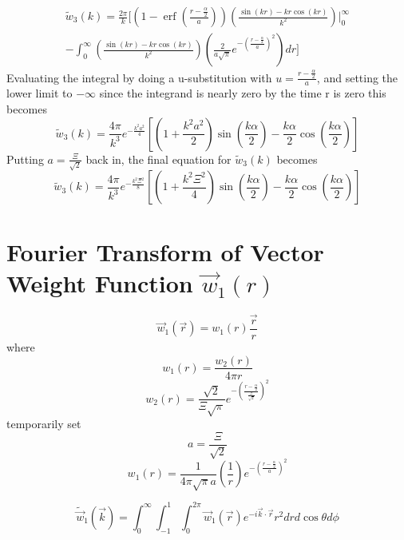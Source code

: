 \documentclass[double,12pt]{beavtex}
\begin{document}
\begin{multline}
  \widetilde{w}_3(k)=\frac{2\pi}{k}\Bigg[\left(1-\operatorname{erf}\left(\frac{r-\frac{\alpha}{2}}{a}\right)\right)\left(\frac{\sin(kr)-kr\cos(kr)}{k^2}\right)\bigg|^{\infty}_0
   \\
  -\int_{0}^{\infty}\left(\frac{\sin(kr)-kr\cos(kr)}{k^2}\right)\left(\frac{2}{a\sqrt{\pi}}e^{-\left(\frac{r-\frac{\alpha}{2}}{a}\right)^2}\right)dr\Bigg]
\end{multline}
Evaluating the integral by doing a u-substitution with $u=\frac{r-\frac{\alpha}{2}}{a}$, and setting the lower limit to $-\infty$  since the integrand is nearly zero by the time r is zero this becomes
\begin{equation}{\widetilde{w}_3(k)=\frac{4\pi}{k^3}e^{-\frac{k^2a^2}{4}}\left[\left(1+\frac{k^2a^2}{2}\right)\sin\left(\frac{k\alpha}{2}\right)-\frac{k\alpha}{2}\cos\left(\frac{k\alpha}{2}\right)\right]}\end{equation}
Putting $a=\frac{\Xi}{\sqrt{2}}$ back in, the final equation for $\widetilde{w}_3(k)$ becomes
\begin{equation}{\widetilde{w}_3(k)=\frac{4\pi}{k^3}e^{-\frac{k^2\Xi^2}{8}}\left[\left(1+\frac{k^2\Xi^2}{4}\right)\sin\left(\frac{k\alpha}{2}\right)-\frac{k\alpha}{2}\cos\left(\frac{k\alpha}{2}\right)\right]}\end{equation}

\section{Fourier Transform of Vector Weight Function $\vec{w}_{1}(r)$}
\begin{equation}{\vec{w}_1(\vec{r})=w_1(r)\frac{\vec{r}}{r}}\end{equation}
where
\begin{equation}{w_1(r)=\frac{w_2(r)}{4{\pi}r}}\end{equation}
\begin{equation}{w_2(r)=\frac{\sqrt{2}}{\Xi\sqrt{\pi}}e^{-\left(\frac{r-\frac{\alpha}{2}}{\frac{\Xi}{\sqrt{2}}}\right)^2}}\end{equation}
temporarily set 
\begin{equation}{a=\frac{\Xi}{\sqrt{2}}}\end{equation}
\begin{equation}{w_1(r)=\frac{1}{4{\pi}\sqrt{\pi}a}\left(\frac{1}{r}\right)e^{-\left(\frac{r-\frac{\alpha}{2}}{a}\right)^2}}\end{equation}

\begin{equation}{\widetilde{\vec{w}}_1(\vec{k})=\int_{0}^{\infty}\int_{-1}^{1}\int_{0}^{2\pi}\vec{w}_1(\vec{r})e^{-i\vec{k}\cdot{\vec{r}}}r^2d{r}d{\cos\theta}d{\phi}}\end{equation}
\end{document}

